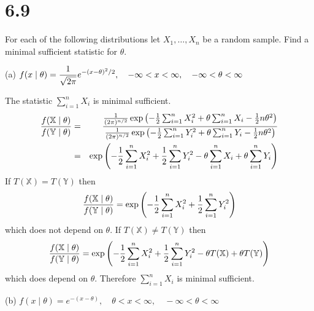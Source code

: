 \section*{6.9}
For each of the following distributions let $X_1,\ldots,X_n$
be a random sample.
Find a minimal sufficient statistic for $\theta$.

\bigskip
\noindent
(a) $\displaystyle{f(x\mid\theta)={1\over\sqrt{2\pi}}
e^{-(x-\theta)^2/2},\quad-\infty<x<\infty,\quad
-\infty<\theta<\infty}$

\bigskip
\noindent
The statistic $\sum_{i=1}^nX_i$ is minimal sufficient.
\begin{eqnarray*}
{f(\mathbb X\mid\theta)\over f(\mathbb Y\mid\theta)}
&=&{
{1\over(2\pi)^{n/2}}
\exp\left(-{1\over2}\sum_{i=1}^nX_i^2+\theta\sum_{i=1}^nX_i-
{1\over2}n\theta^2\right)
\over
{1\over(2\pi)^{n/2}}
\exp\left(-{1\over2}\sum_{i=1}^nY_i^2+\theta\sum_{i=1}^nY_i-
{1\over2}n\theta^2\right)
}\\
&=&\exp\left(
-{1\over2}\sum_{i=1}^nX_i^2
+{1\over2}\sum_{i=1}^nY_i^2
-\theta\sum_{i=1}^nX_i
+\theta\sum_{i=1}^nY_i
\right)
\end{eqnarray*}
If $T(\mathbb X)=T(\mathbb Y)$ then
$${f(\mathbb X\mid\theta)\over f(\mathbb Y\mid\theta)}
=\exp\left(
-{1\over2}\sum_{i=1}^nX_i^2
+{1\over2}\sum_{i=1}^nY_i^2
\right)
$$
which does not depend on $\theta$.
If $T(\mathbb X)\ne T(\mathbb Y)$ then
$${f(\mathbb X\mid\theta)\over f(\mathbb Y\mid\theta)}
=\exp\left(
-{1\over2}\sum_{i=1}^nX_i^2
+{1\over2}\sum_{i=1}^nY_i^2-\theta T(\mathbb X)+\theta T(\mathbb Y)
\right)
$$
which does depend on $\theta$.
Therefore $\sum_{i=1}^nX_i$ is minimal sufficient.

\bigskip
\noindent
(b) $\displaystyle{f(x\mid\theta)=e^{-(x-\theta)},
\quad\theta<x<\infty,\quad-\infty<\theta<\infty}$

